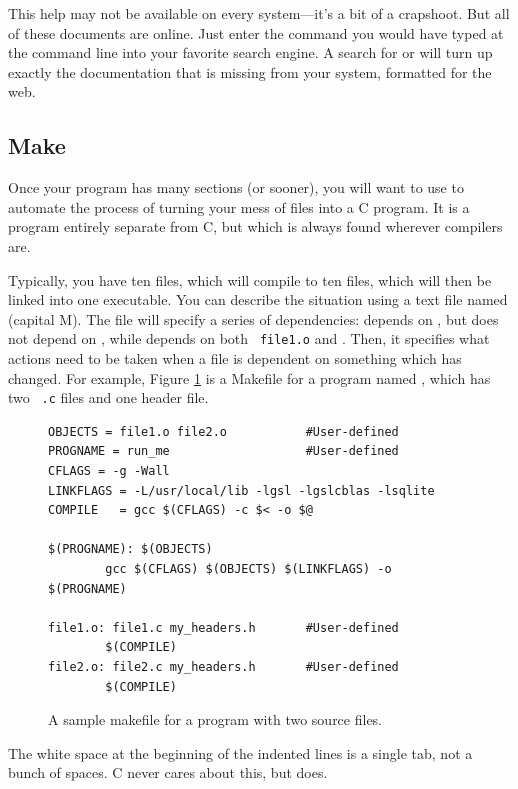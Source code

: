 \documentclass[12pt]{article}
\begin{document}
This help may not be available on every system---it's a bit of
a crapshoot. But all of these documents are online. Just enter the
command you would have typed at the command line into your favorite
search engine. A search for  or  will
turn up exactly the documentation that is missing from your system,
formatted for the web.

\subsection{Make} \label{make} 
Once your program has many sections (or sooner), you will want to use
 to automate the process of turning your mess of files into
a C program.  It is a program entirely separate from C, but which
is always found wherever compilers are.

Typically, you have ten  files, which will compile
to ten  files, which will then be linked into one executable.
You can describe the situation using a
text file named  (capital M). The file will specify a
series of dependencies:  depends on , but does
not depend on , while  depends on both {\tt
file1.o} and .  Then, it specifies what actions need to be taken
when a file is dependent on something which has changed.  For example,
Figure \ref{makefig} is a Makefile for a program named , which has two {\tt
.c} files and one header file.

\begin{figure}
\begin{verbatim}
OBJECTS = file1.o file2.o           #User-defined
PROGNAME = run_me                   #User-defined
CFLAGS = -g -Wall
LINKFLAGS = -L/usr/local/lib -lgsl -lgslcblas -lsqlite
COMPILE   = gcc $(CFLAGS) -c $< -o $@

$(PROGNAME): $(OBJECTS)
        gcc $(CFLAGS) $(OBJECTS) $(LINKFLAGS) -o $(PROGNAME)

file1.o: file1.c my_headers.h       #User-defined
        $(COMPILE)
file2.o: file2.c my_headers.h       #User-defined
        $(COMPILE)
\end{verbatim}
\caption{A sample makefile for a program with two source files.}
\label{makefig}
\end{figure}

The white space at the beginning of the indented lines is a single tab,
not a bunch of spaces.  C never cares about this, but 
does.
\end{document}
